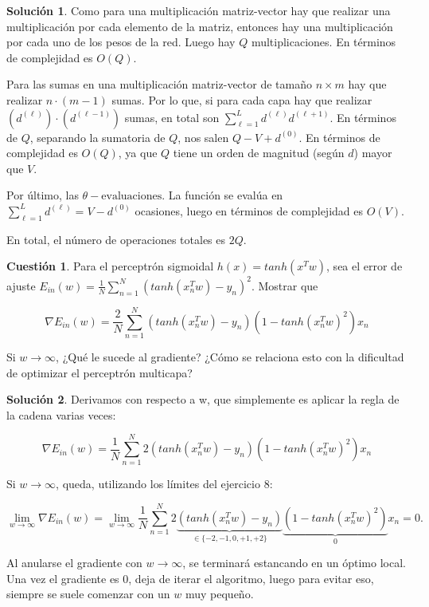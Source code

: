 \documentclass[a4paper, 11pt]{article}
\theoremstyle{definition}
\newtheorem{cuestion}{Cuestión}
\newtheorem*{solucion}{Solución}
\begin{document}
  \begin{solucion}
    Como para una multiplicación matriz-vector hay que realizar una multiplicación por cada elemento de la matriz, entonces hay una multiplicación por cada uno de los pesos de la red. Luego hay $Q$ multiplicaciones. En términos de complejidad es $O(Q)$.

    Para las sumas en una multiplicación matriz-vector de tamaño $n \times m$ hay que realizar $n \cdot (m-1)$ sumas. Por lo que, si para cada capa hay que realizar $\left(d^{(\ell)} \right) \cdot \left(d^{(\ell - 1)} \right)$ sumas, en total son
    $\sum_{\ell=1}^L d^{(\ell)}  d^{(\ell+1)} $. En términos de $Q$, separando la sumatoria de $Q$, nos salen $Q-V+d^{(0)}$. En términos de complejidad es $O(Q)$, ya que $Q$ tiene un orden de magnitud (según $d$) mayor que $V$.

    Por último, las $\theta-\text{evaluaciones}$. La función se evalúa en $\sum_{\ell=1}^L d^{(\ell)} = V - d^{(0)}$ ocasiones, luego en términos de complejidad es $O(V)$.

    En total, el número de operaciones totales es $2Q$.
  \end{solucion}

  \begin{cuestion}
    Para el perceptrón sigmoidal $h(x) = tanh(x^Tw)$, sea el error de ajuste $E_{in}(w) = \frac{1}{N}\sum_{n=1}^N \left( tanh(x_n^Tw) - y_n \right)^2$. Mostrar que

    $$ \nabla E_{in}(w) = \frac{2}{N} \sum_{n=1}^N \left( tanh(x_n^Tw) - y_n \right) \left( 1 - tanh(x_n^Tw)^2 \right) x_n $$

    Si $w \rightarrow \infty$, ¿Qué le sucede al gradiente? ¿Cómo se relaciona esto con la dificultad de optimizar el perceptrón multicapa?

  \end{cuestion}

  \begin{solucion}
    Derivamos con respecto a w, que simplemente es aplicar la regla de la cadena varias veces:

    \[
    \nabla E_{in}(w) = \frac{1}{N} \sum_{n=1}^N 2 \left( tanh(x_n^Tw) - y_n \right) \left( 1 - tanh(x_n^Tw)^2 \right) x_n
    \]

    Si $w \rightarrow \infty$, queda, utilizando los límites del ejercicio 8:

    \[
    \lim_{w \rightarrow \infty}\nabla E_{in}(w) =  \lim_{w \rightarrow \infty}\frac{1}{N} \sum_{n=1}^N 2 \underbrace{\left( tanh(x_n^Tw) - y_n \right)}_{\in \{-2,-1,0,+1,+2\}} \underbrace{\left( 1 - tanh(x_n^Tw)^2 \right)}_{0} x_n = 0.
    \]

    Al anularse el gradiente con $w \rightarrow \infty$, se terminará estancando en un óptimo local. Una vez el gradiente es 0, deja de iterar el algoritmo, luego para evitar eso, siempre se suele comenzar con un $w$ muy pequeño.
  \end{solucion}
\end{document}
